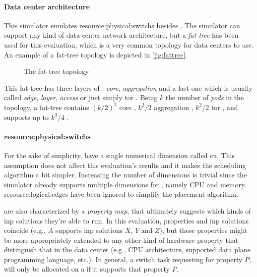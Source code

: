 \paragraph{Data center architecture}
This simulator emulates \glspl{resource:physical:switch} besides .
The simulator can support any kind of data center network architecture, but a \textit{fat-tree} has been used for this evaluation, which is a very common topology for data centers to use. An example of a fat-tree topology is depicted in \autoref{fig:fattree}.
\begin{figure}[!htb]
    \centering
    \usebox{\fattree}
    \caption{The fat-tree topology}
    \label{fig:fattree}
\end{figure}

This fat-tree has three layers of : \textit{core}, \textit{aggregation} and a last one which is usually called \textit{edge}, \textit{layer}, \textit{access} or just simply \gls{tor} .
Being $k$ the number of \textit{pods} in the topology, a fat-tree contains $(k/2)^2$ core , $k^2/2$ aggregation , $k^2/2$ \gls{tor} , and supports up to $k^3/4$ .

\paragraph{\Glspl{resource:physical:switch}} \label{simulator_switch_resources}
For the sake of simplicity,  have a single numerical dimension called \gls{cu}.
This assumption does not affect this evaluation's results and it makes the scheduling algorithm a bit simpler.
Increasing the number of  dimensions is trivial since the simulator already supports multiple dimensions for , namely CPU and memory.
\Glspl{resource:logical:edge} have been ignored to simplify the placement algorithm.

 are also characterized by a \textit{property map}, that ultimately suggests which kinds of \gls{inp} solutions they're able to run.
In this evaluation, properties and \gls{inp} solutions coincide (e.g.,  $A$ supports \gls{inp} solutions $X$, $Y$ and $Z$), but these properties might be more appropriately extended to any other kind of hardware property that distinguish that  in the data center (e.g., CPU architecture, supported data plane programming language, etc.).
In general, a switch task requesting for property $P$, will only be allocated on a  if it supports that property $P$.